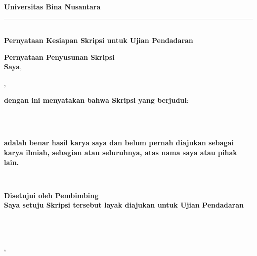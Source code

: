 \thispagestyle{plain}
    \begin{center}
    \textbf{Universitas Bina Nusantara}\\
    \vspace*{-0.5cm}
    \rule{13cm}{1pt} \\
    \vspace*{-0.2cm}
    \textbf{Pernyataan Kesiapan Skripsi untuk Ujian Pendadaran}
    \end{center}

    \textbf{Pernyataan Penyusunan Skripsi}\\
    \indent\textbf{Saya},

    \indent\textbf{\penulisSatu},

    \textbf{dengan ini menyatakan bahwa Skripsi yang berjudul}:

    \begin{center}
    \textbf{\Judul}\\
    \textit{\textbf{\JudulInggris}}\\
    \end{center}

    \noindent\textbf{adalah benar hasil karya saya dan belum pernah diajukan sebagai karya ilmiah, sebagian atau seluruhnya, atas nama saya atau pihak lain.}

    \vspace{1.5cm}
    \begin{center}
        \begin{minipage}{8cm}
        \centering
        \vspace*{1.8cm}%
        \underline{\makebox[6cm][c]{\penulisSatu}}\\[4pt]
        \fontsize{12}{14}\selectfont\bf{\NIMpenulisSatu}
        \end{minipage}
    \end{center}

    \begin{center}
    \textbf{Disetujui oleh Pembimbing}\\
    \textbf{Saya setuju Skripsi tersebut layak diajukan untuk Ujian Pendadaran} \\
    \end{center}

    \vspace{0.5cm}
    \begin{center}
        \begin{minipage}{10cm}
        \centering
        \vspace*{1.8cm}%
        \underline{\pembimbingSatu}\\[4pt]
        \fontsize{12}{14}\selectfont\bf{\nikSatu}\\
        \end{minipage}
    \end{center}
    \begin{center}
        \Kota, \tanggalPengesahan \\
    \end{center}
